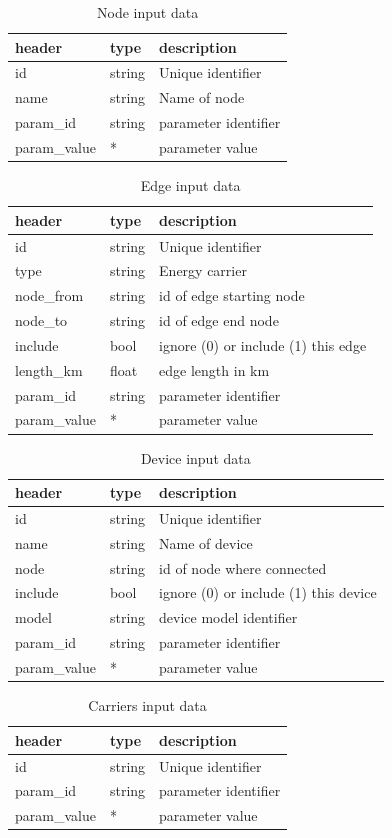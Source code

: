 \documentclass[12pt]{article}
\begin{document}
\begin{table}[h]
\caption{Node input data}
\begin{tabular}{lll}
	\hline
	header & type & description \\
	\hline
	id & string & Unique identifier \\
	name & string & Name of node \\
	param\_id & string & parameter identifier \\
	param\_value & * & parameter value
\end{tabular}
\end{table}

\begin{table}[h]
\caption{Edge input data}
\begin{tabular}{lll}
	\hline
	header & type & description \\
	\hline
	id & string & Unique identifier \\
	type & string & Energy carrier \\
	node\_from & string &  id of edge starting node \\
	node\_to & string &  id of edge end node \\
	include & bool & ignore (0) or include (1) this edge \\
	length\_km & float & edge length in km \\
	param\_id & string & parameter identifier \\
	param\_value & * & parameter value
\end{tabular}
\end{table}

\begin{table}[h]
\caption{Device input data}
\begin{tabular}{lll}
	\hline
	header & type & description \\
	\hline
	id & string & Unique identifier \\
	name & string & Name of device \\
	node & string &  id of node where connected \\
	include & bool & ignore (0) or include (1) this device \\
	model & string & device model identifier \\
	param\_id & string & parameter identifier \\
	param\_value & * & parameter value
\end{tabular}
\end{table}

\begin{table}[h]
\caption{Carriers input data}
\begin{tabular}{lll}
	\hline
	header & type & description \\
	\hline
	id & string & Unique identifier \\
	param\_id & string & parameter identifier \\
	param\_value & * & parameter value
\end{tabular}
\end{table}
\end{document}
